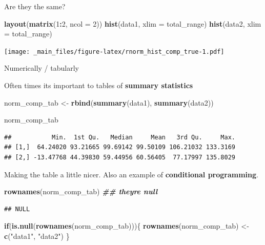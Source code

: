 \documentclass[
]{book}
\newenvironment{Shaded}{\begin{snugshade}}{\end{snugshade}}
\newcommand{\AttributeTok}[1]{\textcolor[rgb]{0.13,0.29,0.53}{#1}}
\newcommand{\ControlFlowTok}[1]{\textcolor[rgb]{0.13,0.29,0.53}{\textbf{#1}}}
\newcommand{\DecValTok}[1]{\textcolor[rgb]{0.00,0.00,0.81}{#1}}
\newcommand{\DocumentationTok}[1]{\textcolor[rgb]{0.56,0.35,0.01}{\textbf{\textit{#1}}}}
\newcommand{\FunctionTok}[1]{\textcolor[rgb]{0.13,0.29,0.53}{\textbf{#1}}}
\newcommand{\NormalTok}[1]{#1}
\newcommand{\OtherTok}[1]{\textcolor[rgb]{0.56,0.35,0.01}{#1}}
\newcommand{\SpecialCharTok}[1]{\textcolor[rgb]{0.81,0.36,0.00}{\textbf{#1}}}
\newcommand{\StringTok}[1]{\textcolor[rgb]{0.31,0.60,0.02}{#1}}
\begin{document}
Are they the same?

\begin{Shaded}
\begin{Highlighting}[]
\FunctionTok{layout}\NormalTok{(}\FunctionTok{matrix}\NormalTok{(}\DecValTok{1}\SpecialCharTok{:}\DecValTok{2}\NormalTok{, }\AttributeTok{ncol =} \DecValTok{2}\NormalTok{))}
\FunctionTok{hist}\NormalTok{(data1, }\AttributeTok{xlim =}\NormalTok{ total\_range)}
\FunctionTok{hist}\NormalTok{(data2, }\AttributeTok{xlim =}\NormalTok{ total\_range)}
\end{Highlighting}
\end{Shaded}

\texttt{[image: \_main\_files/figure-latex/rnorm\_hist\_comp\_true-1.pdf]}

Numerically / tabularly

Often times its important to tables of \textbf{summary statistics}

\begin{Shaded}
\begin{Highlighting}[]
\NormalTok{norm\_comp\_tab }\OtherTok{\textless{}{-}} \FunctionTok{rbind}\NormalTok{(}\FunctionTok{summary}\NormalTok{(data1),}
                       \FunctionTok{summary}\NormalTok{(data2))}

\NormalTok{norm\_comp\_tab}
\end{Highlighting}
\end{Shaded}

\begin{verbatim}
##           Min.  1st Qu.   Median     Mean   3rd Qu.     Max.
## [1,]  64.24020 93.21665 99.69142 99.50109 106.21032 133.3169
## [2,] -13.47768 44.39830 59.44956 60.56405  77.17997 135.8029
\end{verbatim}

Making the table a little nicer. Also an example of \textbf{conditional programming}.

\begin{Shaded}
\begin{Highlighting}[]
\FunctionTok{rownames}\NormalTok{(norm\_comp\_tab) }\DocumentationTok{\#\# they\textquotesingle{}re null}
\end{Highlighting}
\end{Shaded}

\begin{verbatim}
## NULL
\end{verbatim}

\begin{Shaded}
\begin{Highlighting}[]
\ControlFlowTok{if}\NormalTok{(}\FunctionTok{is.null}\NormalTok{(}\FunctionTok{rownames}\NormalTok{(norm\_comp\_tab)))\{}
  \FunctionTok{rownames}\NormalTok{(norm\_comp\_tab) }\OtherTok{\textless{}{-}} \FunctionTok{c}\NormalTok{(}\StringTok{"data1"}\NormalTok{, }\StringTok{"data2"}\NormalTok{)}
\NormalTok{\}}
\end{Highlighting}
\end{Shaded}
\end{document}
